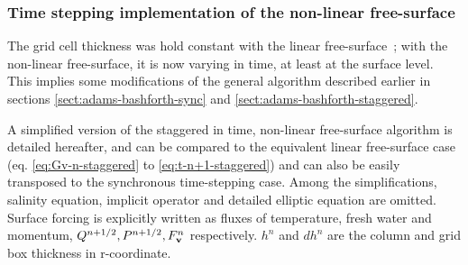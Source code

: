 \subsubsection{Time stepping implementation of the
non-linear free-surface}     
\label{sect:nonlin-freesurf-timestepping}

The grid cell thickness was hold constant with the linear
free-surface~; with the non-linear free-surface, it is now varying 
in time, at least at the surface level.
This implies some modifications of the general algorithm described 
earlier in sections \ref{sect:adams-bashforth-sync} and 
\ref{sect:adams-bashforth-staggered}.

A simplified version of the staggered in time, non-linear 
free-surface algorithm is detailed hereafter, and can be compared 
to the equivalent linear free-surface case (eq. \ref{eq:Gv-n-staggered}
to \ref{eq:t-n+1-staggered}) and can also be easily transposed
to the synchronous time-stepping case.
Among the simplifications, salinity equation, implicit operator
and detailed elliptic equation are omitted. Surface forcing is
explicitly written as fluxes of temperature, fresh water and
momentum, $Q^{n+1/2}, P^{n+1/2}, F_{\bf v}^n$ respectively.
$h^n$ and $dh^n$ are the column and grid box thickness in r-coordinate.
